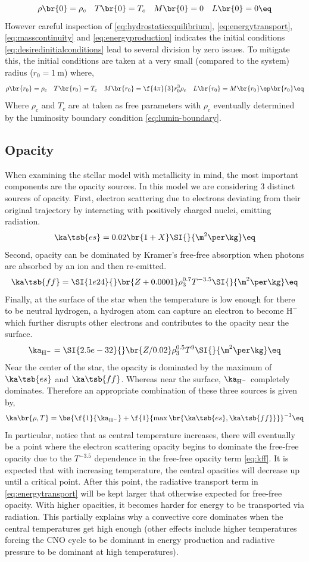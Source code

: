 \documentclass[11pt]{article}
\begin{document}
    \[ \rho\br{0} = \rho_c \quad T\br{0} = T_c \quad M\br{0} = 0 \quad L\br{0} = 0 \eq \label{eq:desiredinitialconditions} \]
    However careful inspection of \eqref{eq:hydrostaticequilibrium}, \eqref{eq:energytransport}, \eqref{eq:masscontinuity} and \eqref{eq:energyproduction} indicates the initial conditions \eqref{eq:desiredinitialconditions} lead to several division by zero issues. To mitigate this, the initial conditions are taken at a very small (compared to the system) radius ($r_0 = \SI{1}{\m}$) where,
    \[ \rho\br{r_0} = \rho_c \quad T\br{r_0} = T_c \quad M\br{r_0} = \f{4\pi}{3}r_0^3 \rho_c \quad L\br{r_0} = M\br{r_0} \ep\br{r_0} \eq \label{eq:initialconditions} \]
    Where $\rho_c$ and $T_c$ are at taken as free parameters with $\rho_c$ eventually determined by the luminosity boundary condition \eqref{eq:lumin-boundary}.
    \subsection{Opacity}
    \label{sec:opacity}
    When examining the stellar model with metallicity in mind, the most important components are the opacity sources. In this model we are considering 3 distinct sources of opacity. First, electron scattering due to electrons deviating from their original trajectory by interacting with positively charged nuclei, emitting radiation.
    \[ \ka\tsb{es} = 0.02 \br{1+X}\SI{}{\m^2\per\kg} \eq \label{eq:kes}\]
    Second, opacity can be dominated by Kramer's free-free absorption when photons are absorbed by an ion and then re-emitted.
    \[ \ka\tsb{ff} = \SI{1e24}{}\br{Z + 0.0001}\rho_3^{0.7}T^{-3.5}\SI{}{\m^2\per\kg} \eq \label{eq:kff}\]
    Finally, at the surface of the star when the temperature is low enough for there to be neutral hydrogen, a hydrogen atom can capture an electron to become $\text{H}^-$ which further disrupts other electrons and contributes to the opacity near the surface.
    \[ \ka_{\text{H}^-} = \SI{2.5e-32}{}\br{Z/0.02} \rho_3^{0.5} T^9 \SI{}{\m^2\per\kg} \eq\label{eq:kh}\]
    Near the center of the star, the opacity is dominated by the maximum of $\ka\tsb{es}$ and $\ka\tsb{ff}$. Whereas near the surface, $\ka_{\text{H}^-}$ completely dominates. Therefore an appropriate combination of these three sources is given by,
    \[ \ka\br{\rho, T} = \bs{\f{1}{\ka_{\text{H}^-}} + \f{1}{\max\br{\ka\tsb{es},\ka\tsb{ff}}}}^{-1} \eq\label{eq:opacitycombo} \]
    In particular, notice that as central temperature increases, there will eventually be a point where the electron scattering opacity begins to dominate the free-free opacity due to the $T^{-3.5}$ dependence in the free-free opacity term \eqref{eq:kff}. It is expected that with increasing temperature, the central opacities will decrease up until a critical point. After this point, the radiative transport term in \eqref{eq:energytransport} will be kept larger that otherwise expected for free-free opacity. With higher opacities, it becomes harder for energy to be transported via radiation. This partially explains why a convective core dominates when the central temperatures get high enough (other effects include higher temperatures forcing the CNO cycle to be dominant in energy production and radiative pressure to be dominant at high temperatures). \\
\end{document}
